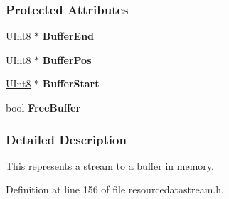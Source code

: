 \subsubsection*{Protected Attributes}
\begin{DoxyCompactItemize}
\item 
\hypertarget{classMezzanine_1_1Resource_1_1MemoryDataStream_a4bb72ac6ff5f54abfc5bcf675374927f}{
\hyperlink{namespaceMezzanine_aa5f38583d9025e05fa33d6e32e97b457}{UInt8} $\ast$ {\bfseries BufferEnd}}
\label{classMezzanine_1_1Resource_1_1MemoryDataStream_a4bb72ac6ff5f54abfc5bcf675374927f}

\item 
\hypertarget{classMezzanine_1_1Resource_1_1MemoryDataStream_a7631501e3e159b8113fc00fb29142d2f}{
\hyperlink{namespaceMezzanine_aa5f38583d9025e05fa33d6e32e97b457}{UInt8} $\ast$ {\bfseries BufferPos}}
\label{classMezzanine_1_1Resource_1_1MemoryDataStream_a7631501e3e159b8113fc00fb29142d2f}

\item 
\hypertarget{classMezzanine_1_1Resource_1_1MemoryDataStream_aaac73aa94fe15d6c2846a935b06688a3}{
\hyperlink{namespaceMezzanine_aa5f38583d9025e05fa33d6e32e97b457}{UInt8} $\ast$ {\bfseries BufferStart}}
\label{classMezzanine_1_1Resource_1_1MemoryDataStream_aaac73aa94fe15d6c2846a935b06688a3}

\item 
\hypertarget{classMezzanine_1_1Resource_1_1MemoryDataStream_a0ebe10faf8b63b5ebf4e4632f64f5d18}{
bool {\bfseries FreeBuffer}}
\label{classMezzanine_1_1Resource_1_1MemoryDataStream_a0ebe10faf8b63b5ebf4e4632f64f5d18}

\end{DoxyCompactItemize}


\subsubsection{Detailed Description}
This represents a stream to a buffer in memory. 

Definition at line 156 of file resourcedatastream.h.



